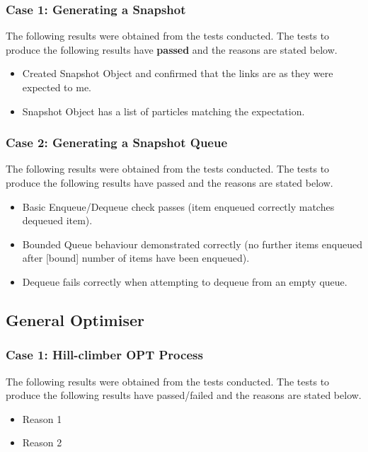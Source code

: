 \documentclass[11pt]{article}
\begin{document}
\subsubsection{Case 1: Generating a Snapshot}
The following results were obtained from the tests conducted. The tests to produce the
following results have \textbf{passed} and the reasons are stated below.

\begin{itemize}
	\item Created Snapshot Object and confirmed that the links are as they were expected to me.
	\item Snapshot Object has a list of particles matching the expectation.
\end{itemize}

\subsubsection{Case 2: Generating a Snapshot Queue}
The following results were obtained from the tests conducted. The tests to produce the
following results have passed and the reasons are stated below.

\begin{itemize}
	\item Basic Enqueue/Dequeue check passes (item enqueued correctly matches dequeued item).
	\item Bounded Queue behaviour demonstrated correctly (no further items enqueued after [bound] number of items have been enqueued).
	\item Dequeue fails correctly when attempting to dequeue from an empty queue.
\end{itemize}

\subsection{General Optimiser}
\subsubsection{Case 1: Hill-climber OPT Process}
The following results were obtained from the tests conducted. The tests to produce the
following results have passed/failed and the reasons are stated below.

\begin{itemize}
	\item Reason 1
	\item Reason 2
\end{itemize}
\end{document}
